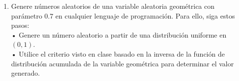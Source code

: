 \documentclass[a4paper, 12pt]{article}
\newcommand{\Pspace}{0.5cm}
\newcommand{\Aspace}{0.2cm}
\begin{document}
\begin{enumerate}
    \vspace{\Pspace}
    \item Genere números aleatorios de una variable aleatoria geométrica con parámetro 0.7 en cualquier lenguaje de programación. Para ello, siga estos pasos:
    \vspace{0.2cm}
    \\ • Genere un número aleatorio a partir de una distribución uniforme en $(0, 1)$.
    \\ • Utilice el criterio visto en clase basado en la inversa de la función de distribución acumulada de la variable geométrica para determinar el valor generado.
    \vspace{\Aspace} \par
    { \color{azul}  }
\end{enumerate}
\end{document}
